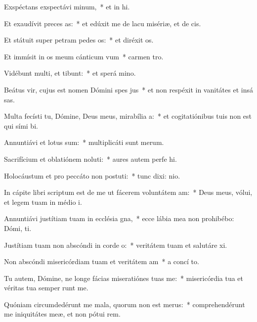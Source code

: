 \item Exspéctans exspectávi minum,~* et in hi.
\item Et exaudívit preces as:~* et edúxit me de lacu misériæ, et de  cis.
\item Et státuit super petram pedes os:~* et diréxit  os.
\item Et immísit in os meum cánticum vum~* carmen  tro.
\item Vidébunt multi, et tibunt:~* et sperá  mino.
\item Beátus vir, cujus est nomen Dómini spes jus~* et non respéxit in vanitátes et insá sas.
\item Multa fecísti tu, Dómine, Deus meus, mirabília a:~* et cogitatiónibus tuis non est qui sími  bi.
\item Annuntiávi et lotus sum:~* multiplicáti sunt  merum.
\item Sacrifícium et oblatiónem noluti:~* aures autem perfe hi.
\item Holocáustum et pro peccáto non postuti:~* tunc dixi:  nio.
\item In cápite libri scriptum est de me ut fácerem voluntátem am:~* Deus meus, vólui, et legem tuam in médio  i.
\item Annuntiávi justítiam tuam in ecclésia gna,~* ecce lábia mea non prohibébo: Dómi,  ti.
\item Justítiam tuam non abscóndi in corde o:~* veritátem tuam et salutáre  xi.
\item Non abscóndi misericórdiam tuam et veritátem am~* a concí to.
\item Tu autem, Dómine, ne longe fácias miseratiónes tuas  me:~* misericórdia tua et véritas tua semper runt me.
\item Quóniam circumdedérunt me mala, quorum non est merus:~* comprehendérunt me iniquitátes meæ, et non pótui  rem.
